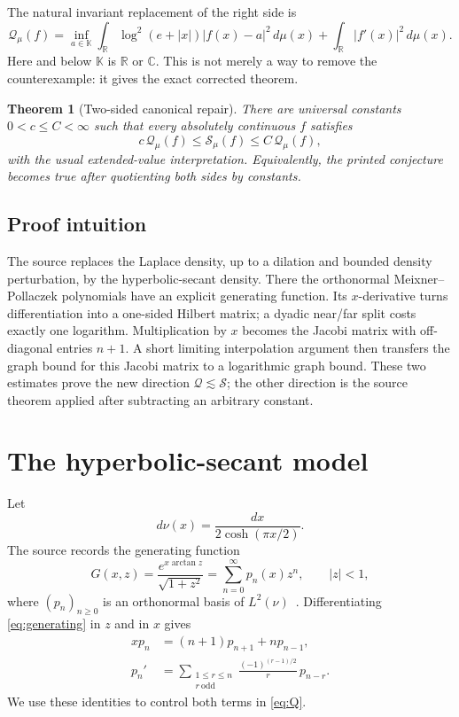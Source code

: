 \documentclass[11pt]{article}
\newtheorem{theorem}{Theorem}
\newcommand{\R}{\mathbb R}
\newcommand{\K}{\mathbb K}
\begin{document}
The natural invariant replacement of the right side is
\begin{equation}\label{eq:Q}
 \mathcal Q_\mu(f)=\inf_{a\in\K}
 \int_\R\log^2(e+|x|)|f(x)-a|^2\,d\mu(x)
 +\int_\R|f'(x)|^2\,d\mu(x).
\end{equation}
Here and below $\K$ is $\R$ or $\mathbb C$.  This is not merely a way to
remove the counterexample: it gives the exact corrected theorem.

\begin{theorem}[Two-sided canonical repair]\label{thm:main}
There are universal constants $0<c\le C<\infty$ such that every absolutely
continuous $f$ satisfies
\begin{equation}\label{eq:equivalence}
 c\,\mathcal Q_\mu(f)\le \mathcal S_\mu(f)
 \le C\,\mathcal Q_\mu(f),
\end{equation}
with the usual extended-value interpretation.  Equivalently, the printed
conjecture becomes true after quotienting both sides by constants.
\end{theorem}

\subsection*{Proof intuition}
The source replaces the Laplace density, up to a dilation and bounded density
perturbation, by the hyperbolic-secant density.  There the orthonormal
Meixner--Pollaczek polynomials have an explicit generating function.  Its
$x$-derivative turns differentiation into a one-sided Hilbert matrix; a
dyadic near/far split costs exactly one logarithm.  Multiplication by $x$
becomes the Jacobi matrix with off-diagonal entries $n+1$.  A short limiting
interpolation argument then transfers the graph bound for this Jacobi matrix
to a logarithmic graph bound.  These two estimates prove the new direction
$\mathcal Q\lesssim\mathcal S$; the other direction is the source theorem
applied after subtracting an arbitrary constant.

\section{The hyperbolic-secant model}

Let
\begin{equation}\label{eq:nu}
 d\nu(x)=\frac{dx}{2\cosh(\pi x/2)}.
\end{equation}
The source records the generating function
\begin{equation}\label{eq:generating}
 G(x,z)=\frac{e^{x\arctan z}}{\sqrt{1+z^2}}
 =\sum_{n=0}^{\infty}p_n(x)z^n,\qquad |z|<1,
\end{equation}
where $(p_n)_{n\ge0}$ is an orthonormal basis of $L^2(\nu)$~\cite[Sec.~1.1]{BK}.
Differentiating \eqref{eq:generating} in $z$ and in $x$ gives
\begin{align}
 xp_n&=(n+1)p_{n+1}+np_{n-1}, \label{eq:recurrence}\\
 p_n'&=\sum_{\substack{1\le r\le n\\r\ \mathrm{odd}}}
 \frac{(-1)^{(r-1)/2}}{r}\,p_{n-r}. \label{eq:derivative}
\end{align}
We use these identities to control both terms in \eqref{eq:Q}.
\end{document}
